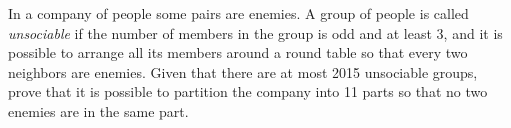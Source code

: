 In a company of people some pairs are enemies. A group of people is called \emph{unsociable} if the number of members in the group is odd and at least 3, and it is possible to arrange all its members around a round table so that every two neighbors are enemies. Given that there are at most 2015 unsociable groups, prove that it is possible to partition the company into 11 parts so that no two enemies are in the same part.
